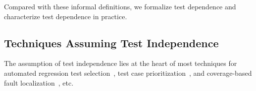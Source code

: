 Compared with these informal definitions,
we formalize test dependence and characterize 
test dependence in practice.



\subsection{Techniques Assuming Test Independence}

The assumption of test independence lies at the heart of most
techniques for automated regression test selection~\cite{harroldetal:OOPSLA:2001, Orso:2004:SRT,
Briand:2009:ART, Zhang:2012:RMT, Nanda:2011:RTP},
test case prioritization~\cite{Elbaum:2000:PTC:347324.348910, Kim:2002:HTP:581339.581357, Rummel:2005:TPR:1066677.1067016, Srivastava:2002:EPT:566172.566187, Jiang:2009:ART}, 
and coverage-based fault localization~\cite{Steimann:2013, Zhang:2013:IMF, Jones:2002:VTI}, etc. 


